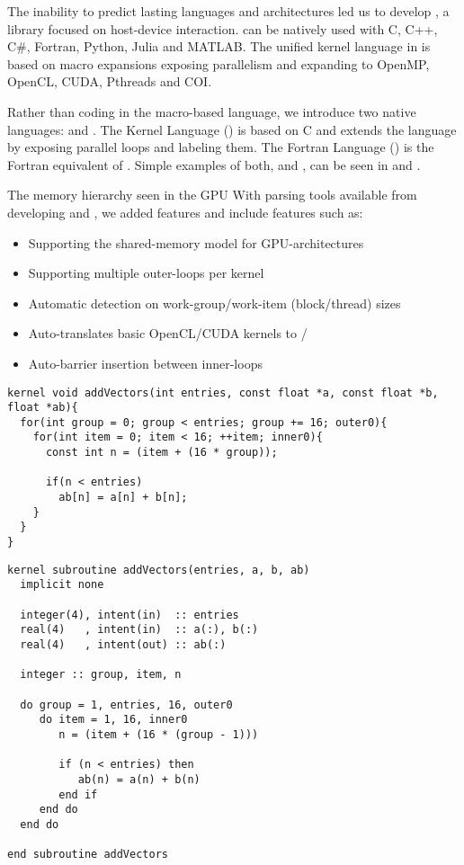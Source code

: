 \documentclass[12pt]{article}
\begin{document}
\pagestyle{empty}

\placeTitlePage

The inability to predict lasting languages and architectures led us to develop \occa, a library focused on host-device interaction.
\occa can be natively used with C, C++, C\#, Fortran, Python, Julia and MATLAB.
The unified kernel language in \occa is based on macro expansions exposing parallelism and expanding to OpenMP, OpenCL, CUDA, Pthreads and COI.

Rather than coding in the \occa macro-based language, we introduce two native languages: \okl and \ofl.
The \occa Kernel Language (\okl) is based on C and extends the language by exposing parallel loops and labeling them.
The \occa Fortran Language (\ofl) is the Fortran equivalent of \okl.
Simple examples of both, \okl and \ofl, can be seen in  and .

The memory hierarchy seen in the GPU
With parsing tools available from developing \okl and \ofl, we added features
\okl and \ofl include features such as:
\begin{itemize}
\item Supporting the shared-memory model for GPU-architectures
\item Supporting multiple outer-loops per kernel
\item Automatic detection on work-group/work-item (block/thread) sizes
\item Auto-translates basic OpenCL/CUDA kernels to \okl/\ofl
\item Auto-barrier insertion between inner-loops
\end{itemize}

\vspace{4mm}
\begin{lstlisting}[caption={Adding two vectors using \occa Kernel Language (\okl)},label={lst:addVectors}]
kernel void addVectors(int entries, const float *a, const float *b, float *ab){
  for(int group = 0; group < entries; group += 16; outer0){
    for(int item = 0; item < 16; ++item; inner0){
      const int n = (item + (16 * group));

      if(n < entries)
        ab[n] = a[n] + b[n];
    }
  }
}
\end{lstlisting}

\vspace{4mm}
\begin{lstlisting}[caption={Adding two vectors using \occa Fortran Language (\ofl)},label={lst:ofl_addVectors}]
kernel subroutine addVectors(entries, a, b, ab)
  implicit none

  integer(4), intent(in)  :: entries
  real(4)   , intent(in)  :: a(:), b(:)
  real(4)   , intent(out) :: ab(:)

  integer :: group, item, n

  do group = 1, entries, 16, outer0
     do item = 1, 16, inner0
        n = (item + (16 * (group - 1)))

        if (n < entries) then
           ab(n) = a(n) + b(n)
        end if
     end do
  end do

end subroutine addVectors
\end{lstlisting}
\end{document}
